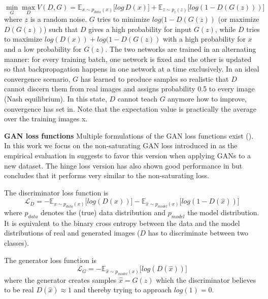 \documentclass[12pt,a4paper]{article}
\begin{document}
\begin{equation} \label{eq:1}
\min\limits_{G} \max\limits_{D} V(D,G) = \mathbb{E}_{x\sim p_{data} (x)}\big[log\, D(x)\big] + \mathbb{E}_{z\sim p_{z} (z)}\big[log(1 - D(G(z)))\big]
\end{equation}
where $z$ is a random noise. $G$ tries to minimize $log(1 - D(G(z))$ (or maximize $D(G(z))$) such that $D$ gives a high probability for input $G(z)$, while $D$ tries to maximize $log(D(x)) + log(1 - D(G(z))$ with a high probability for $x$ and a low probability for $G(z)$. The two networks are trained in an alternating manner: for every training batch, one network is fixed and the other is updated so that backpropagation happens in one network at a time exclusively. In an ideal convergence scenario, $G$ has learned to produce samples so realistic that $D$ cannot discern them from real images and assigns probability 0.5 to every image (Nash equilibrium). In this state, $D$ cannot teach $G$ anymore how to improve, convergence has set in. Note that the expectation value is practically the average over the training images x.

\par \textbf{GAN loss functions} 
Multiple formulations of the GAN loss functions exist (\cite{GANLandscape}). In this work we focus on the non-saturating GAN loss introduced in \cite{1406.2661} as the empirical evaluation in \cite{GANLandscape} suggests to favor this version when applying GANs to a new dataset. The hinge loss version has also shown good performance in \cite{SNGAN} but \cite{GANLandscape} concludes that it performs very similar to the non-saturating loss.

The discriminator loss function is
\begin{equation} \label{eq:d_loss}
    \mathcal{L}_{D} = -\mathbb{E}_{x\sim p_{data} (x)}\big[log(D(x))\big] - \mathbb{E}_{\hat{x}\sim p_{model} (x)}\big[log(1 - D(\hat{x}))\big]
\end{equation}
where $p_{data}$ denotes the (true) data distribution and $p_{model}$ the model distribution. It is equivalent to the binary cross entropy between the data and the model distributions of real and generated images ($D$ has to discriminate between two classes).

The generator loss function is
\begin{equation} \label{eq:g_loss}
    \mathcal{L}_{G} = -\mathbb{E}_{\hat{x}\sim p_{model} (x)}\big[log(D(\hat{x}))\big]
\end{equation}
where the generator creates samples $\hat{x} = G(z)$ which the discriminator believes to be real $D(\hat{x}) \approx 1$ and thereby trying to approach $log(1) = 0$.
\end{document}
